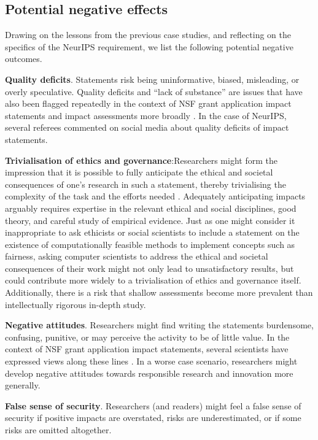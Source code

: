 \documentclass[11pt,english]{article}
\begin{document}
\subsection{Potential negative effects}

Drawing on the lessons from the previous case studies, and reflecting on the specifics of the NeurIPS requirement, we list the following potential negative outcomes.

\textbf{Quality deficits}. Statements risk being uninformative, biased, misleading, or overly speculative. Quality deficits and ``lack of substance'' \citep[p.185]{bozeman_broad_2009} are issues that have also been flagged repeatedly in the context of NSF grant application impact statements and impact assessments more broadly \citep{frodeman_sciences_2007,gray_review_1999}. In the case of NeurIPS, several referees commented on social media about quality deficits of impact statements. 

\textbf{Trivialisation of ethics and governance}:Researchers might form the impression that it is possible to fully anticipate the ethical and societal consequences of one's research in such a statement, thereby trivialising the complexity of the task and the efforts needed \citep{holbrook_peer_2011,european_commission_assessing_2005,spaapen_introducing_2011}. Adequately anticipating impacts arguably requires expertise in the relevant ethical and social disciplines, good theory, and careful study of empirical evidence. Just as one might consider it inappropriate to ask ethicists or social scientists to include a statement on the existence of computationally feasible methods to implement concepts such as fairness, asking computer scientists to address the ethical and societal consequences of their work might not only lead to unsatisfactory results, but could contribute more widely to a trivialisation of ethics and governance itself. Additionally, there is a risk that shallow assessments become more prevalent than intellectually rigorous in-depth study. 

\textbf{Negative attitudes}. Researchers might find writing the statements burdensome, confusing, punitive, or may perceive the activity to be of little value. In the context of NSF grant application impact statements, several scientists have expressed views along these lines \citep{tretkoff_nsfs_2007}. In a worse case scenario, researchers might develop negative attitudes towards responsible research and innovation more generally.

\textbf{False sense of security}. Researchers (and readers) might feel a false sense of security if positive impacts are overstated, risks are underestimated, or if some risks are omitted altogether.
\end{document}
